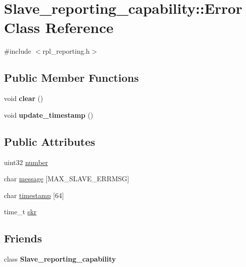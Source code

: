 \hypertarget{classSlave__reporting__capability_1_1Error}{}\section{Slave\+\_\+reporting\+\_\+capability\+:\+:Error Class Reference}
\label{classSlave__reporting__capability_1_1Error}


{\ttfamily \#include $<$rpl\+\_\+reporting.\+h$>$}

\subsection*{Public Member Functions}
\begin{DoxyCompactItemize}
\item 
\mbox{\label{classSlave__reporting__capability_1_1Error_a6d59d0deea894444ffdd3fff3a262d97}} 
void {\bfseries clear} ()
\item 
\mbox{\label{classSlave__reporting__capability_1_1Error_a8de624f05bf357350d5b284c17df7764}} 
void {\bfseries update\+\_\+timestamp} ()
\end{DoxyCompactItemize}
\subsection*{Public Attributes}
\begin{DoxyCompactItemize}
\item 
uint32 \mbox{\hyperlink{classSlave__reporting__capability_1_1Error_acc56e3d5b9a78e6715acdd818f590c60}{number}}
\item 
char \mbox{\hyperlink{classSlave__reporting__capability_1_1Error_a0e4cef02aa836c73ea2c032aa1f9469a}{message}} \mbox{[}M\+A\+X\+\_\+\+S\+L\+A\+V\+E\+\_\+\+E\+R\+R\+M\+SG\mbox{]}
\item 
char \mbox{\hyperlink{classSlave__reporting__capability_1_1Error_a591736bef68a00d3898d1b6e232a2158}{timestamp}} \mbox{[}64\mbox{]}
\item 
time\+\_\+t \mbox{\hyperlink{classSlave__reporting__capability_1_1Error_a6d3255961990e0c44a5944e58421155a}{skr}}
\end{DoxyCompactItemize}
\subsection*{Friends}
\begin{DoxyCompactItemize}
\item 
\mbox{\label{classSlave__reporting__capability_1_1Error_a9d860c04cff4fdc84a2ca5cce5201de9}} 
class {\bfseries Slave\+\_\+reporting\+\_\+capability}
\end{DoxyCompactItemize}


